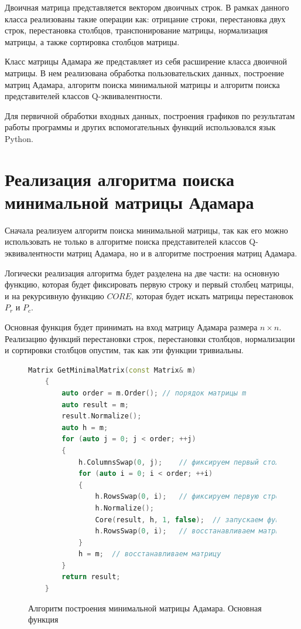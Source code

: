 Двоичная матрица представляется вектором двоичных строк. В рамках данного класса реализованы такие операции как: отрицание строки, перестановка двух строк, перестановка столбцов, транспонирование матрицы, нормализация матрицы, а также сортировка столбцов матрицы.

Класс матрицы Адамара же представляет из себя расширение класса двоичной матрицы. В нем реализована обработка пользовательских данных, построение матриц Адамара, алгоритм поиска минимальной матрицы и алгоритм поиска представителей классов Q-эквивалентности.

Для первичной обработки входных данных, построения графиков по результатам работы программы и других вспомогательных функций использовался язык Python.

\section{Реализация алгоритма поиска минимальной матрицы Адамара}
\label{mm_finder_s}

Сначала реализуем алгоритм поиска минимальной матрицы, так как его можно использовать не только в алгоритме поиска представителей классов Q-эквивалентности матриц Адамара, но и в алгоритме построения матриц Адамара.

Логически реализация алгоритма будет разделена на две части: на основную функцию, которая будет фиксировать первую строку и первый столбец матрицы, и на рекурсивную функцию $CORE$, которая будет искать матрицы перестановок $P_r$ и $P_c$.

Основная функция будет принимать на вход матрицу Адамара размера $n \times n$. Реализацию функций перестановки строк, перестановки столбцов, нормализации и сортировки столбцов опустим, так как эти функции тривиальны.

\begin{figure}[H]
    \centering
    \begin{minipage}{\linewidth}
    \begin{lstlisting}[language=c++, tabsize=4, showspaces=false, basicstyle=\fontsize{9.5}{9.5}\selectfont, numbers=none]
    Matrix GetMinimalMatrix(const Matrix& m)
    {
        auto order = m.Order(); // порядок матрицы m
        auto result = m;
        result.Normalize();
        auto h = m;
        for (auto j = 0; j < order; ++j)
        {
            h.ColumnsSwap(0, j);    // фиксируем первый столбец
            for (auto i = 0; i < order; ++i)
            {
                h.RowsSwap(0, i);   // фиксируем первую строку
                h.Normalize();
                Core(result, h, 1, false);  // запускаем функцию по поиску минимальной матрицы
                h.RowsSwap(0, i);   // восстанавливаем матрицу
            }
            h = m;  // восстанавливаем матрицу
        }
        return result;
    }
    \end{lstlisting}
    \end{minipage}
    \caption{Алгоритм построения минимальной матрицы Адамара. Основная функция}
    \label{alg:mm_finder_main}
\end{figure}

